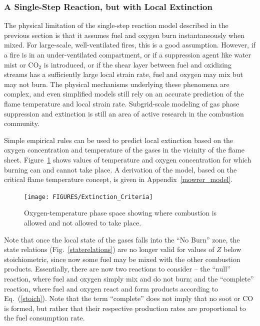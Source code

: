 \documentclass[11pt]{book}
\begin{document}
\subsubsection{A Single-Step Reaction, but with Local Extinction}

\label{extinction}

The physical limitation of the single-step reaction model described in the previous section is that it assumes fuel and
oxygen burn instantaneously when mixed. For large-scale, well-ventilated
fires, this is a good assumption. However, if a fire is in an
under-ventilated compartment, or if a suppression agent like water
mist or CO$_2$ is introduced, or if the shear layer between fuel and oxidizing streams
has a sufficiently large local strain rate,
fuel and oxygen may mix but may not burn.
The physical mechanisms underlying these phenomena are complex, and
even simplified models still rely on an accurate prediction
of the flame temperature and local strain rate.
Subgrid-scale modeling of gas phase suppression and
extinction is still an area of active research in the combustion
community.

Simple empirical rules can be used to predict local
extinction based on the oxygen concentration and temperature of
the gases in the vicinity of the flame sheet.
Figure~\ref{plotsupp} shows values of temperature and oxygen
concentration for which burning can and cannot take place. A derivation of the model,
based on the critical flame temperature concept, is given in Appendix~\ref{mowrer_model}.
\begin{figure}[ht]
\begin{minipage}[t]{4.1in}
\texttt{[image: FIGURES/Extinction\_Criteria]}
\caption{Oxygen-temperature phase space showing where combustion
is allowed and not allowed to take place.}
\label{plotsupp}
\end{minipage}
\end{figure}
Note that once the local state of the gases falls into the ``No Burn'' zone,
the state relations (Fig.~\ref{staterelations}) are no longer valid for
values of $Z$ below stoichiometric, since now some fuel may be mixed
with the other combustion products. Essentially, there
are now two reactions to consider -- the ``null'' reaction, where fuel and oxygen simply mix and do not burn;
and the ``complete'' reaction,
where fuel and oxygen react and form products according to Eq.~(\ref{stoich}). Note that the term ``complete'' does not imply that
no soot or CO is formed, but rather that their respective production rates are proportional to the fuel consumption rate.
\end{document}

